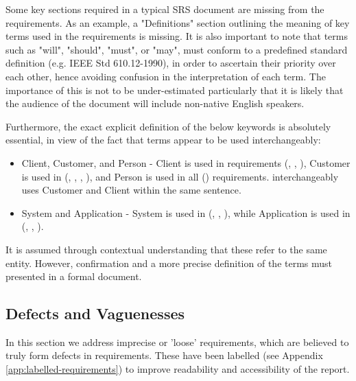 Some key sections required in a typical SRS document are missing from the requirements.  As an example, a "Definitions" section outlining the meaning of key terms used in the requirements is missing.  It is also important to note that terms such as "will", "should", "must", or "may", must conform to a predefined standard definition (e.g. IEEE Std 610.12-1990), in order to ascertain their priority over each other, hence avoiding confusion in the interpretation of each term. The importance of this is not to be under-estimated particularly that it is likely that the audience of the document will include non-native English speakers.
\par
Furthermore, the exact explicit definition of the below keywords is absolutely essential, in view of the fact that terms appear to be used interchangeably:
\begin{itemize}
    \item Client, Customer, and Person - Client is used in requirements (\ROne, \RTwo, \RFive), Customer is used in (\RTwo, \RThree, \RFour, \RFive), and Person is used in all (\REight) requirements. \RFive \space interchangeably uses Customer and Client within the same sentence. 
    \item System and Application - System is used in (\RTwo, \RSix, \RSeven), while Application is used in (\ROne, \RFour, \RFive). 
\end{itemize}
It is assumed through contextual understanding that these refer to the same entity.  However, confirmation and a more precise definition of the terms must presented in a formal document.
\par


\subsection{Defects and Vaguenesses}

In this section we address imprecise or 'loose' requirements, which are believed to truly form defects in requirements.
These have been labelled (see Appendix \ref{app:labelled-requirements}) to improve readability and accessibility of the report.

